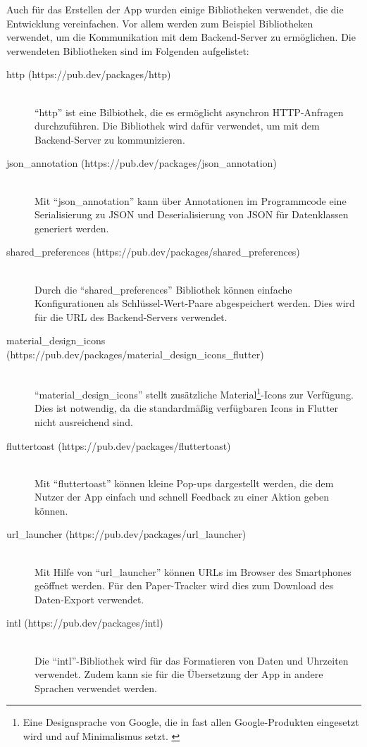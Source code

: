Auch für das Erstellen der App wurden einige Bibliotheken verwendet, die die Entwicklung vereinfachen.
Vor allem werden zum Beispiel Bibliotheken verwendet, um die Kommunikation mit dem Backend-Server zu ermöglichen.
Die verwendeten Bibliotheken sind im Folgenden aufgelistet:
\begin{description}
	\item[http (https://pub.dev/packages/http)] \hfill \\
		\enquote{http} ist eine Bilbiothek, die es ermöglicht asynchron \gls{HTTP}-Anfragen durchzuführen. Die Bibliothek wird dafür verwendet, um mit dem Backend-Server zu kommunizieren.
	\item[json\_annotation (https://pub.dev/packages/json\_annotation)] \hfill \\
		Mit \enquote{json\_annotation} kann über Annotationen im Programmcode eine Serialisierung zu \gls{JSON} und Deserialisierung von \gls{JSON} für Datenklassen generiert werden.
	\item[shared\_preferences (https://pub.dev/packages/shared\_preferences)] \hfill \\
		Durch die \enquote{shared\_preferences} Bibliothek können einfache Konfigurationen als Schlüssel-Wert-Paare abgespeichert werden. Dies wird für die \gls{URL} des Backend-Servers verwendet.
	\item[material\_design\_icons (https://pub.dev/packages/material\_design\_icons\_flutter)] \hfill \\
		\enquote{material\_design\_icons} stellt zusätzliche Material\footnote{Eine Designsprache von
			Google, die in fast allen Google-Produkten eingesetzt wird und auf Minimalismus setzt.
			\cite{Google2020}}-Icons zur Verfügung. Dies ist notwendig, da die standardmäßig verfügbaren Icons in Flutter nicht ausreichend sind.
	\item[fluttertoast (https://pub.dev/packages/fluttertoast)] \hfill \\
		Mit \enquote{fluttertoast} können kleine Pop-ups dargestellt werden, die dem Nutzer der App einfach und schnell Feedback zu einer Aktion geben können.
	\item[url\_launcher (https://pub.dev/packages/url\_launcher)] \hfill \\
		Mit Hilfe von \enquote{url\_launcher} können \gls{URL}s im Browser des Smartphones geöffnet werden. Für den Paper-Tracker wird dies zum Download des Daten-Export verwendet.
	\item[intl (https://pub.dev/packages/intl)] \hfill \\
		Die \enquote{intl}-Bibliothek wird für das Formatieren von Daten und Uhrzeiten verwendet. Zudem kann sie für die Übersetzung der App in andere Sprachen verwendet werden.
\end{description}

